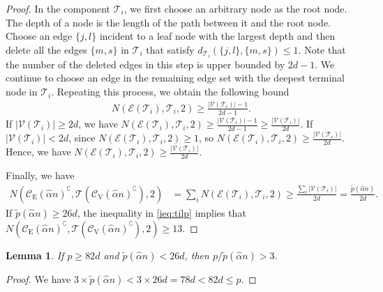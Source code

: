 \documentclass[11pt,onecolumn]{article}
\newcommand{\calE}{\mathcal{E}}
\newcommand{\calT}{\mathcal{T}}
\newcommand{\calV}{\mathcal{V}}
\newcommand{\scC}{\mathscr{C}}
\newcommand{\tilp}{\tilde{p}}
\newcommand{\halpha}{\hat{\alpha}}
\newtheorem{lemma}{Lemma}
\begin{document}
\begin{proof}
	In the component $\calT_{i}$, we first choose an arbitrary node as the root node. The depth of a node is the length of the path between it and the root node. Choose an edge $\{j,l\}$ 
	incident to a leaf node with the largest depth and then delete all the edges $\{m,s\}$ in $\calT_{i}$ that satisfy $d_{\calT_{i}}(\{j,l\},\{m,s\})\leq 1$. Note that the number of the deleted edges 
	in this step is upper bounded by $2d-1$. We continue to choose an edge in the remaining edge set with the deepest terminal node in $\calT_{i}$. Repeating this process, we obtain the following bound
	\begin{align}
		N(\calE(\calT_{i}),\calT_{i},2)\geq \frac{|\calV(\calT_{i})|-1}{2d-1}.
	\end{align}
	If $|\calV(\calT_{i})|\geq 2d$, we have $N(\calE(\calT_{i}),\calT_{i},2)\geq\frac{|\calV(\calT_{i})|-1}{2d-1}\geq\frac{|\calV(\calT_{i})|}{2d}$. If $|\calV(\calT_{i})|< 2d$, since $N(\calE(\calT_{i}),\calT_{i},2)\geq 1$, so $N(\calE(\calT_{i}),\calT_{i},2)\geq \frac{|\calV(\calT_{i})|}{2d}$. Hence, we have  $N(\calE(\calT_{i}),\calT_{i},2)\geq \frac{|\calV(\calT_{i})|}{2d}$.


	Finally, we have
	\begin{align}\label{ieq:tilp}
		N(\scC_{\mathrm{E}}(\halpha n)^{\complement},\calT(\scC_{\mathrm{V}}(\halpha n)^{\complement}),2)&=\sum_{i} N(\calE(\calT_{i}),\calT_{i},2)\geq \frac{\sum_{i}|\calV(\calT_{i})|}{2d}=\frac{\tilp(\halpha n)}{2d}.
	\end{align}
	If $\tilp(\halpha n)\geq 26d$, the inequality in \eqref{ieq:tilp} implies that $N(\scC_{\mathrm{E}}(\halpha n)^{\complement},\calT(\scC_{\mathrm{V}}(\halpha n)^{\complement}),2)\geq 13$.
\end{proof}

\begin{lemma}\label{lem:numsample}
	If $p\geq 82d$ and $\tilp(\halpha n)<26d$, then $p/ \tilp(\halpha n)>3$.
\end{lemma}
\begin{proof}
    We have
	$
		3\times \tilp(\halpha n) <3\times 26d=78d<82d\leq p.
	$
\end{proof}
\end{document}
